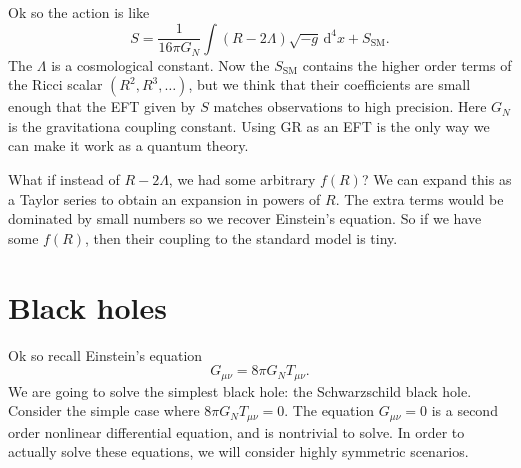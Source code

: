 
Ok so the action is like
\[
	S=\frac{1}{16\pi G_N} \int (R-2\Lambda )\sqrt{-g}  \,\mathrm{d} ^4x + S_{\mathrm{SM} } 
.\]
The $\Lambda $ is a cosmological constant. Now the $S_{\mathrm{SM} } $ contains the higher order terms of the Ricci scalar $(R^2,R^3, \ldots )$, but we think that their coefficients are small enough that the EFT given by $S$ matches observations to high precision. Here $G_N$ is the gravitationa coupling constant. Using GR as an EFT is the only way we can make it work as a quantum theory.

What if instead of $R-2\Lambda $, we had some arbitrary $f(R)$? We can expand this as a Taylor series to obtain an expansion in powers of $R$. The extra terms would be dominated by small numbers so we recover Einstein's equation. So if we have some $f(R)$, then their coupling to the standard model is tiny.

\chapter{Black holes}

Ok so recall Einstein's equation
\[
	G_{\mu \nu } =8\pi G_N T_{\mu \nu } 
.\]
We are going to solve the simplest black hole: the Schwarzschild black hole. Consider the simple case where $8\pi G_NT_{\mu \nu } =0$. The equation $G_{\mu \nu } =0$ is a second order nonlinear differential equation, and is nontrivial to solve. In order to actually solve these equations, we will consider highly symmetric scenarios.

